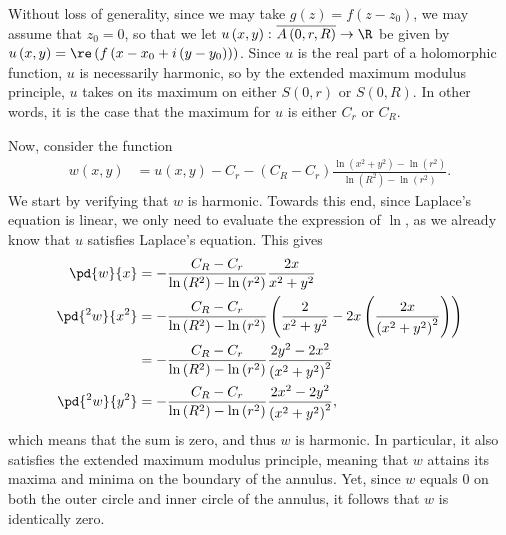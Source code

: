 \documentclass[10pt]{mypackage}
\begin{document}
\begin{solution}
  Without loss of generality, since we may take $g(z) = f\left( z-z_0 \right)$, we may assume that $z_0 = 0$, so that we let $u\left( x,y \right)\colon \overline{A\left( 0,r,R \right)}\rightarrow \R$ be given by $ u\left( x,y \right) = \re\left( f\left( x-x_0 + i\left( y-y_0 \right) \right) \right) $. Since $u$ is the real part of a holomorphic function, $u$ is necessarily harmonic, so by the extended maximum modulus principle, $u$ takes on its maximum on either $S\left( 0,r \right)$ or $S\left( 0,R \right)$. In other words, it is the case that the maximum for $u$ is either $C_r$ or $C_R$.\newline

  Now, consider the function
  \begin{align*}
    w\left( x,y \right) &= u\left( x,y \right) - C_r - \left( C_R - C_r \right)\frac{\ln\left( x^2 + y^2 \right) - \ln\left( r^2 \right)}{\ln\left( R^2 \right) - \ln\left( r^2 \right)}.
  \end{align*}
  We start by verifying that $w$ is harmonic. Towards this end, since Laplace's equation is linear, we only need to evaluate the expression of $\ln$, as we already know that $u$ satisfies Laplace's equation. This gives
  \begin{align*}
    \pd{w}{x} &= -\frac{C_R - C_r}{\ln\left( R^2 \right) - \ln\left( r^2 \right)}\frac{2x}{x^2 + y^2}\\
    \pd{^2w}{x^2} &= -\frac{C_R - C_r}{\ln\left( R^2 \right) - \ln\left( r^2 \right)} \left( \frac{2}{x^2 + y^2} - 2x\left( \frac{2x}{\left( x^2 + y^2 \right)^2} \right) \right)\\
                  &= -\frac{C_R - C_r}{\ln\left( R^2 \right) - \ln\left( r^2 \right)} \frac{2y^2 - 2x^2}{\left( x^2 + y^2 \right)^2}\\
    \pd{^2w}{y^2} &= -\frac{C_R - C_r}{\ln\left( R^2 \right) - \ln\left( r^2 \right)} \frac{2x^2 - 2y^2}{\left( x^2 + y^2 \right)^2},
  \end{align*}
  which means that the sum is zero, and thus $w$ is harmonic. In particular, it also satisfies the extended maximum modulus principle, meaning that $w$ attains its maxima and minima on the boundary of the annulus. Yet, since $w$ equals $0$ on both the outer circle and inner circle of the annulus, it follows that $w$ is identically zero.\newline


\end{solution}
\end{document}
